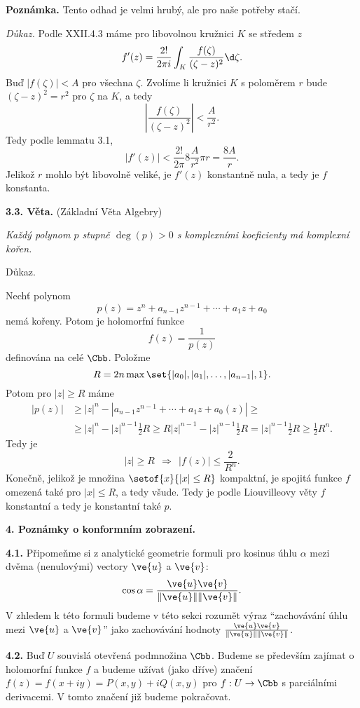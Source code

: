 \documentclass[12pt]{article}
\begin{document}
\medskip

{\bf Poznámka.} Tento odhad je velmi hrubý, ale pro naše potřeby stačí.

\bigskip


{\em Důkaz.} Podle XXII.4.3 máme pro libovolnou kružnici $K$ se středem $z$
$$
f'(z)=\frac{2!}{2\pi i}\int_K\frac{f(\zeta)}{(\zeta-z)^2}\d \zeta.
$$
Buď $|f(\zeta)|<A$ pro všechna $\zeta$. Zvolíme li kružnici  $K$ s poloměrem  $r$ bude $(\zeta-z)^2=r^2$  pro $\zeta$ na $K$, a tedy
$$
\left|\frac{f(\zeta)}{(\zeta-z)^2}\right|<\frac{A}{r^2}.
$$
Tedy podle lemmatu 3.1,
$$
|f'(z)|<\frac{2!}{2\pi}8\frac{A}{r^2}\pi r=\frac{8A}{r}.
$$
Jelikož  $r$ mohlo být libovolně veliké, je $f'(z)$ konstantně nula, a tedy je $f$ konstanta.\sq

\bigskip

{\bf 3.3. Věta.} (Základní  Věta Algebry) {\em Každý polynom $p$ stupně $\deg(p)>0$ s komplexními koeficienty má komplexní kořen.

Důkaz.} Nechť polynom
$$
p(z)= z^n+a_{n-1}z^{n-1}+\cdots+a_1z+a_0
$$
nemá kořeny. Potom je holomorfní funkce
$$
f(z)=\frac1{p(z)}
$$
definována na celé $\Cbb$. Položme
$$
R=2n\max\set{|a_0|,|a_1|,\dots,|a_{n-1}|,1}. 
$$
Potom pro $|z|\geq R$ máme
$$
\begin{aligned}
|p(z)|&\geq |z|^n-|a_{n-1}z^{n-1}+\cdots+a_1z+a_0(z)|\geq\\
&\geq |z|^n-|z|^{n-1}\frac12 R\geq  R|z|^{n-1}-|z|^{n-1}\frac12 R
=|z|^{n-1}\frac12 R\geq\frac12 R^{n}.
\end{aligned}
$$
Tedy je
$$
|z|\geq R\ \ \Rightarrow\ \ |f(z)|\leq\frac{2}{R^n}.
$$
Konečně, jelikož je množina $\setof{x}{|x|\leq R}$ kompaktní, je spojitá funkce $f$ omezen\'a tak\'e pro $|x|\leq R$, a tedy všude. Tedy je podle Liouvilleovy věty $f$ konstantní a tedy je konstantní také $p$.\sq

\vskip10mm
 
 {\large\bf 4. Poznámky o konformním zobrazení.}
 
 \bigskip
 
 {\bf 4.1.} Připomeňme si z analytické geometrie formuli pro kosinus úhlu
$\alpha$ mezi dvěma (nenulovými) vectory $\ve{u}$ a $\ve{v}$:
$$
\cos\alpha=\frac{\ve{u}\ve{v}}{\|\ve{u}\| \|\ve{v}\|}.
$$
V zhledem k této formuli budeme v této sekci rozumět výraz  ``zachovávání úhlu mezi $\ve{u}$  a $\ve{v}$'' jako zachovávání hodnoty
$\frac{\ve{u}\ve{v}}{\|\ve{u}\| \|\ve{v}\|}$.

\bigskip

{\bf 4.2.} Buď $U$ souvislá otevřená podmnožina $\Cbb$. Budeme se především zajímat o holomorfní funkce
 $f$ a budeme užívat (jako dříve) značení $f(z)=f(x+iy)=P(x,y)+iQ(x,y)$  pro $f:U\to \Cbb$ s parciálními derivacemi. V tomto značení již budeme pokračovat. 
\end{document}
